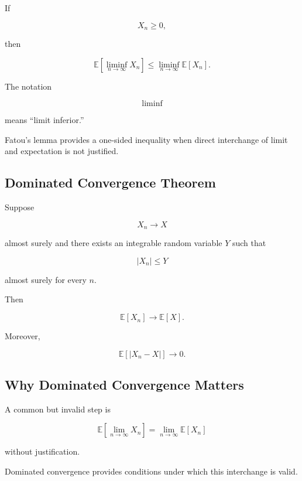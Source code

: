 \begin{theorem}
If

\[
X_n\geq0,
\]

then

\[
\boxed{
\mathbb{E}
\left[
\liminf_{n\to\infty}X_n
\right]
\leq
\liminf_{n\to\infty}
\mathbb{E}[X_n].
}
\]
\end{theorem}

The notation

\[
\liminf
\]

means ``limit inferior.''

Fatou's lemma provides a one-sided inequality when direct interchange of
limit and expectation is not justified.

\subsection{Dominated Convergence Theorem}
\label{subsec:dct-probability}

\begin{theorem}
Suppose

\[
X_n\to X
\]

almost surely and there exists an integrable random variable \(Y\) such
that

\[
|X_n|\leq Y
\]

almost surely for every \(n\).

Then

\[
\boxed{
\mathbb{E}[X_n]
\to
\mathbb{E}[X].
}
\]
\end{theorem}

Moreover,

\[
\boxed{
\mathbb{E}[|X_n-X|]\to0.
}
\]

\subsection{Why Dominated Convergence Matters}
\label{subsec:why-dct-probability}

A common but invalid step is

\[
\mathbb{E}
\left[
\lim_{n\to\infty}X_n
\right]
=
\lim_{n\to\infty}
\mathbb{E}[X_n]
\]

without justification.

Dominated convergence provides conditions under which this interchange
is valid.

